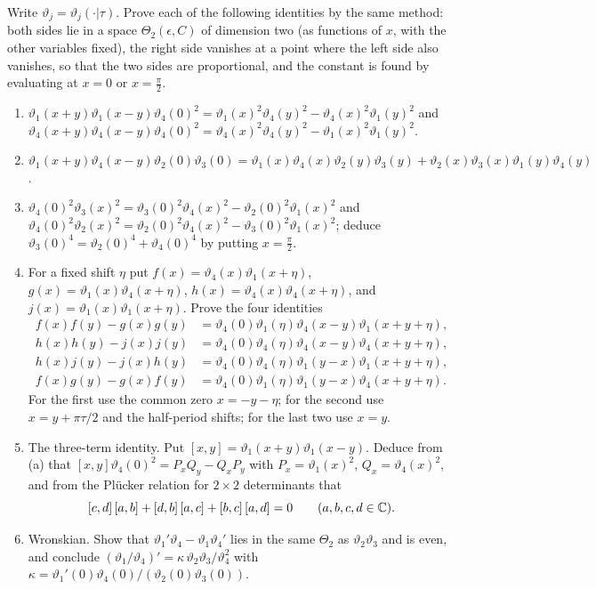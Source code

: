 \begin{exercise}
Write $\vartheta_j=\vartheta_j(\cdot|\tau)$.  Prove each of the following
identities by the same method: both sides lie in a space
$\Theta_2(\epsilon,C)$ of dimension two (as functions of $x$, with the
other variables fixed), the right side vanishes at a point where the left
side also vanishes, so that the two sides are proportional, and the constant
is found by evaluating at $x=0$ or $x=\frac\pi2$.
\begin{enumerate}[label=(\alph*)]
\item $\vartheta_1(x+y)\vartheta_1(x-y)\vartheta_4(0)^2=\vartheta_1(x)^2\vartheta_4(y)^2-\vartheta_4(x)^2\vartheta_1(y)^2$
and $\vartheta_4(x+y)\vartheta_4(x-y)\vartheta_4(0)^2=\vartheta_4(x)^2\vartheta_4(y)^2-\vartheta_1(x)^2\vartheta_1(y)^2$.
\item $\vartheta_1(x+y)\vartheta_4(x-y)\vartheta_2(0)\vartheta_3(0)=\vartheta_1(x)\vartheta_4(x)\vartheta_2(y)\vartheta_3(y)+\vartheta_2(x)\vartheta_3(x)\vartheta_1(y)\vartheta_4(y)$.
\item $\vartheta_4(0)^2\vartheta_3(x)^2=\vartheta_3(0)^2\vartheta_4(x)^2-\vartheta_2(0)^2\vartheta_1(x)^2$
and $\vartheta_4(0)^2\vartheta_2(x)^2=\vartheta_2(0)^2\vartheta_4(x)^2-\vartheta_3(0)^2\vartheta_1(x)^2$;
deduce $\vartheta_3(0)^4=\vartheta_2(0)^4+\vartheta_4(0)^4$ by putting $x=\frac\pi2$.
\item For a fixed shift $\eta$ put
$f(x)=\vartheta_4(x)\vartheta_1(x+\eta)$,
$g(x)=\vartheta_1(x)\vartheta_4(x+\eta)$,
$h(x)=\vartheta_4(x)\vartheta_4(x+\eta)$, and
$j(x)=\vartheta_1(x)\vartheta_1(x+\eta)$.
Prove the four identities
\begin{align*}
 f(x)f(y)-g(x)g(y)
 &=\vartheta_4(0)\vartheta_1(\eta)
       \vartheta_4(x-y)\vartheta_1(x+y+\eta),\\
 h(x)h(y)-j(x)j(y)
 &=\vartheta_4(0)\vartheta_4(\eta)
       \vartheta_4(x-y)\vartheta_4(x+y+\eta),\\
 h(x)j(y)-j(x)h(y)
 &=\vartheta_4(0)\vartheta_4(\eta)
       \vartheta_1(y-x)\vartheta_1(x+y+\eta),\\
 f(x)g(y)-g(x)f(y)
 &=\vartheta_4(0)\vartheta_1(\eta)
       \vartheta_1(y-x)\vartheta_4(x+y+\eta).
\end{align*}
For the first use the common zero $x=-y-\eta$; for the
second use $x=y+\pi\tau/2$ and the half-period shifts;
for the last two use $x=y$.
\item The three-term identity.  Put $[x,y]=\vartheta_1(x+y)\vartheta_1(x-y)$.
Deduce from (a) that $[x,y]\vartheta_4(0)^2=P_xQ_y-Q_xP_y$ with
$P_x=\vartheta_1(x)^2$, $Q_x=\vartheta_4(x)^2$, and from the Pl\"ucker
relation for $2\times2$ determinants that
\[
 [c,d]\,[a,b]+[d,b]\,[a,c]+[b,c]\,[a,d]=0\qquad(a,b,c,d\in\mathbb C).
\]
\item Wronskian.  Show that $\vartheta_1'\vartheta_4-\vartheta_1\vartheta_4'$
lies in the same $\Theta_2$ as $\vartheta_2\vartheta_3$ and is even, and
conclude $(\vartheta_1/\vartheta_4)'=\kappa\,\vartheta_2\vartheta_3/\vartheta_4^2$
with $\kappa=\vartheta_1'(0)\vartheta_4(0)/(\vartheta_2(0)\vartheta_3(0))$.
\end{enumerate}
\end{exercise}

